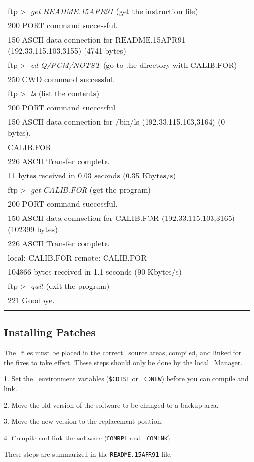 {\begin{tabular}[h]{l}
ftp$>$ {\it get README.15APR91} \hfill (get the instruction file) \\
200 PORT command successful. \\
150 ASCII data connection for README.15APR91 (192.33.115.103,3155) (4741 bytes). \\
ftp$>$ {\it cd Q/PGM/NOTST}        \hfill (go to the directory with CALIB.FOR) \\
250 CWD command successful. \\
ftp$>$ {\it ls}    \hfill (list the contents) \\
200 PORT command successful. \\
150 ASCII data connection for /bin/ls (192.33.115.103,3164) (0 bytes). \\
CALIB.FOR \\
226 ASCII Transfer complete. \\
11 bytes received in 0.03 seconds (0.35 Kbytes/s) \\
ftp$>$ {\it get CALIB.FOR} \hfill (get the program) \\
200 PORT command successful. \\
150 ASCII data connection for CALIB.FOR (192.33.115.103,3165) (102399 bytes). \\
226 ASCII Transfer complete. \\
local: CALIB.FOR remote: CALIB.FOR \\
104866 bytes received in 1.1 seconds (90 Kbytes/s) \\
ftp$>$ {\it quit} \hfill (exit the program) \\
221 Goodbye. \\
\underline{\hskip 6.2in} \\
\end{tabular}
}

\normalstyle

\subsection{Installing Patches}
The \AIPS\ files must be placed in the correct \AIPS\ source areas,
compiled, and linked for the fixes to take effect.  These steps should
only be done by the local \AIPS\ Manager.
\begin{description}
\item{1.} Set the \AIPS\ environment variables ({\tt \$CDTST} or {\tt
   CDNEW}) before you can compile and link.
\item{2.} Move the old version of the software to be changed to a
   backup area.
\item{3.} Move the new version to the replacement position.
\item{4.} Compile and link the software ({\tt COMRPL} and {\tt
   COMLNK}).
\end{description}
These steps are summarized in the {\tt README.15APR91} file.

